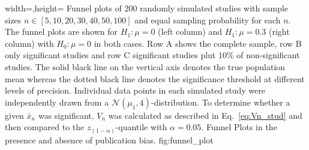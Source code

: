   {width=\textwidth,height=\textheight}%
  {Funnel plots of $200$ randomly simulated studies with sample sizes ${n \in [5,10,20,30,40,50,100]}$ and equal sampling probability for each $n$. The funnel plots are shown for ${H_1: \mu = 0}$ (left column) and ${H_1: \mu = 0.3}$ (right column) with ${H_0: \mu = 0}$ in both cases. Row A shows the complete sample, row B only significant studies and row C significant studies plut $10\%$ of non-significant studies. The solid black line on the vertical axis denotes the true population mean whereas the dotted black line denotes the significance threshold at different levels of precision. Individual data points in each simulated study were independently drawn from a $\mathcal{N}(\mu_1,4)$-distribution. To determine whether a given $\bar{x}_n$ was significant, $V_n$ was calculated as described in Eq.~\ref{eq:Vn_stud} and then compared to the $z_{(1-\alpha)}$-quantile with $\alpha = 0.05$.} %
  {Funnel Plots in the presence and absence of publication bias.}%
  {fig:funnel_plot}%
\clearpage

